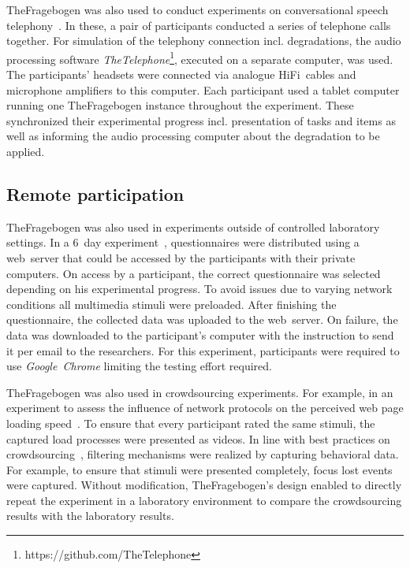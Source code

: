 \documentclass[conference,a4paper]{IEEEtran}
\newcommand{\url}[1]{#1}
\begin{document}
TheFragebogen was also used to conduct experiments on conversational speech telephony~\cite[p.\,37ff.]{guse_multi-episodic_2016}.
In these, a pair of participants conducted a series of telephone calls together.
For simulation of the telephony connection incl. degradations, the audio processing software \emph{TheTelephone}\footnote{\url{https://github.com/TheTelephone}}, executed on a separate computer, was used.
The participants' headsets were connected via analogue HiFi~cables and microphone amplifiers to this computer.
Each participant used a tablet computer running one TheFragebogen instance throughout the experiment.
These synchronized their experimental progress incl. presentation of tasks and items as well as informing the audio processing computer about the degradation to be applied.

\subsection{Remote participation}

TheFragebogen was also used in experiments outside of controlled laboratory settings.
In a 6~day experiment~\cite[p.\,66]{guse_multi-episodic_2016}, questionnaires were distributed using a web~server that could be accessed by the participants with their private computers.
On access by a participant, the correct questionnaire was selected depending on his experimental progress.
To avoid issues due to varying network conditions all multimedia stimuli were preloaded.
After finishing the questionnaire, the collected data was uploaded to the web~server.
On failure, the data was downloaded to the participant's computer with the instruction to send it per email to the researchers.
For this experiment, participants were required to use \emph{Google~Chrome} limiting the testing effort required.

TheFragebogen was also used in crowdsourcing experiments.
For example, in an experiment to assess the influence of network protocols on the perceived web page loading speed~\cite{zimmermann_qoe_2017}.
To ensure that every participant rated the same stimuli, the captured load processes were presented as videos.
In line with best practices on crowdsourcing~\cite{HossfeldBestPractices}, filtering mechanisms were realized by capturing behavioral data.
For example, to ensure that stimuli were presented completely, focus lost events were captured.
Without modification, TheFragebogen's design enabled to directly repeat the experiment in a laboratory environment to compare the crowdsourcing results with the laboratory results.
\end{document}
